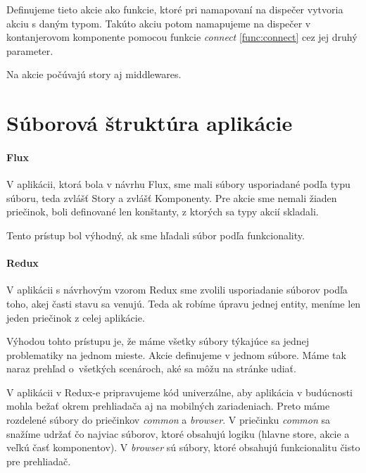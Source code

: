 Definujeme tieto akcie ako funkcie, ktoré pri namapovaní na dispečer vytvoria akciu s daným typom. Takúto akciu potom namapujeme na dispečer v kontanjerovom komponente pomocou funkcie \emph{connect} \ref{func:connect} cez jej druhý parameter.

Na akcie počúvajú story aj middlewares.



\section{Súborová štruktúra aplikácie}
\paragraph{Flux}
V aplikácii, ktorá bola v návrhu Flux, sme mali súbory usporiadané podľa typu súboru, teda zvlášť Story a zvlášť Komponenty. Pre akcie sme nemali žiaden priečinok, boli definované len konštanty, z ktorých sa typy akcií skladali.

Tento prístup bol výhodný, ak sme hľadali súbor podľa funkcionality.

\paragraph{Redux}
V aplikácii s návrhovým vzorom Redux sme zvolili usporiadanie súborov podľa toho, akej časti stavu sa venujú. Teda ak robíme úpravu jednej entity, meníme len jeden priečinok z celej aplikácie.

Výhodou tohto prístupu je, že máme všetky súbory týkajúce sa jednej problematiky na jednom mieste.
Akcie definujeme v jednom súbore. Máme tak naraz prehľad o~všetkých scenároch, aké sa môžu na stránke udiať.

V aplikácii v Redux-e pripravujeme kód univerzálne, aby aplikácia v budúcnosti mohla bežať okrem prehliadača aj na mobilných zariadeniach. Preto máme rozdelené súbory do priečinkov \emph{common} a \emph{browser}. V priečinku \emph{common} sa snažíme udržať čo najviac súborov, ktoré obsahujú logiku (hlavne store, akcie a veľkú časť komponentov). V \emph{browser} sú súbory, ktoré obsahujú funkcionalitu čisto pre prehliadač.
